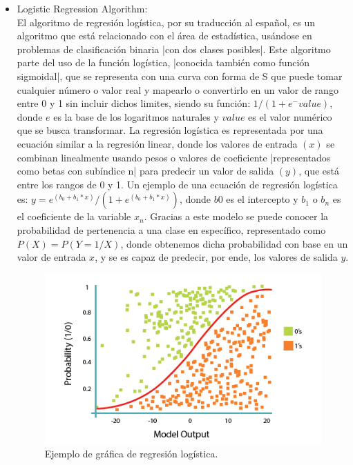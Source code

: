 \documentclass[spanish,12pt,letterpaper]{article}
\begin{document}
\begin{itemize}
    \item Logistic Regression Algorithm:\\
    El algoritmo de regresión logística, por su traducción al español, es un algoritmo que está relacionado con el área de estadística, usándose en problemas de clasificación binaria |con dos clases posibles|. Este algoritmo parte del uso de la función logística, |conocida también como función sigmoidal|, que se representa con una curva con forma de S que puede tomar cualquier número o valor real y mapearlo o convertirlo en un valor de rango entre 0 y 1 sin incluir dichos limites, siendo su función: $1 / (1 + e^-value)$, donde $e$ es la base de los logaritmos naturales y $value$ es el valor numérico que se busca transformar.
    La regresión logística es representada por una ecuación similar a la regresión linear, donde los valores de entrada $(x)$ se combinan linealmente usando pesos o valores de coeficiente |representados como betas con subíndice n| para predecir un valor de salida $(y)$, que está entre los rangos de 0 y 1. Un ejemplo de una ecuación de regresión logística es: $y = e^(b_0 + b_1*x) / (1 + e^(b_0 + b_1*x))$, donde $b0$ es el intercepto y $b_1$ o $b_n$ es el coeficiente de la variable $x_n$. Gracias a este modelo se puede conocer la probabilidad de pertenencia a una clase en específico, representado como $P(X) = P(Y=1/X)$, donde obtenemos dicha probabilidad con base en un valor de entrada $x$, y se es capaz de predecir, por ende, los valores de salida $y$.
    \begin{figure}[H]
        \centering
        \includegraphics[width=0.8\columnwidth]{Regresion_Logistica.png}
        \caption{Ejemplo de gráfica de regresión logística.}
        \label{fig:comand}%
    \end{figure}
    

\end{itemize}
\end{document}

